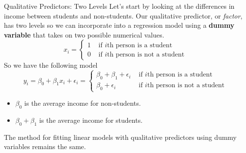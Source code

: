 \documentclass[
  ignorenonframetext,
  aspectratio=169,
]{beamer}
\begin{document}
\begin{frame}{Qualitative Predictors: Two Levels}
\protect\hypertarget{qualitative-predictors-two-levels}{}
Let's start by looking at the differences in income between students and
non-students. Our qualitative predictor, or \emph{factor}, has two
levels so we can incorporate into a regression model using a
\textbf{dummy variable} that takes on two possible numerical values. \[
x_{i}=\left\{\begin{array}{ll}
1 & \text { if } i \text{th person is a student } \\
0 & \text { if } i \text{th person is not a student }
\end{array}\right. 
\] So we have the following model \[
y_{i}=\beta_{0}+\beta_{1} x_{i}+\epsilon_{i}=\left\{\begin{array}{ll}
\beta_{0}+\beta_{1}+\epsilon_{i} & \text { if } i \text{th person is a student } \\
\beta_{0}+\epsilon_{i} & \text { if } i \text{th person is not a student }
\end{array}\right.
\]

\begin{itemize}
\item
  \(\beta_0\) is the average income for non-students.
\item
  \(\beta_0 + \beta_1\) is the average income for students.
\end{itemize}

The method for fitting linear models with qualitative predictors using
dummy variables remains the same.
\end{frame}
\end{document}
